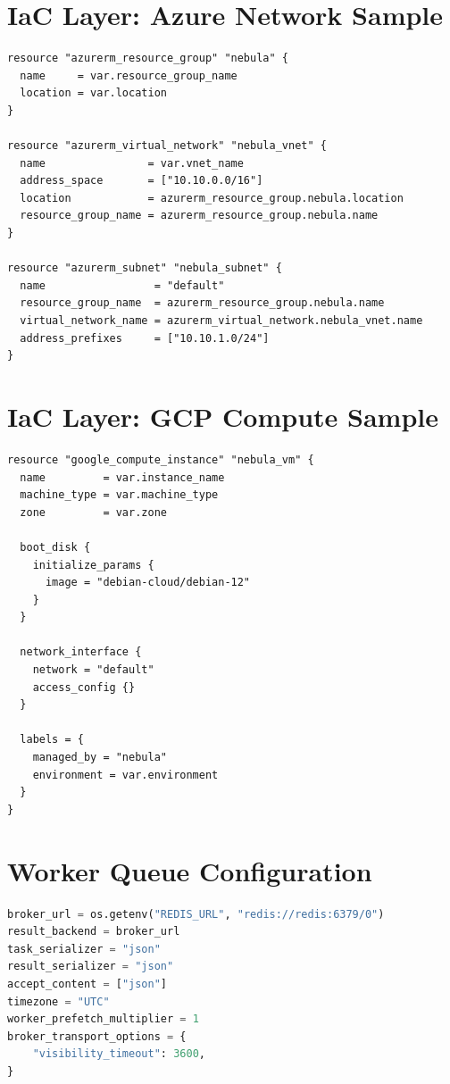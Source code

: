 \section{IaC Layer: Azure Network Sample}
\begin{lstlisting}[language=XML, caption=Azure VNet Module (network.tf)]
resource "azurerm_resource_group" "nebula" {
  name     = var.resource_group_name
  location = var.location
}

resource "azurerm_virtual_network" "nebula_vnet" {
  name                = var.vnet_name
  address_space       = ["10.10.0.0/16"]
  location            = azurerm_resource_group.nebula.location
  resource_group_name = azurerm_resource_group.nebula.name
}

resource "azurerm_subnet" "nebula_subnet" {
  name                 = "default"
  resource_group_name  = azurerm_resource_group.nebula.name
  virtual_network_name = azurerm_virtual_network.nebula_vnet.name
  address_prefixes     = ["10.10.1.0/24"]
}
\end{lstlisting}

\section{IaC Layer: GCP Compute Sample}
\begin{lstlisting}[language=XML, caption=GCP VM Module (main.tf)]
resource "google_compute_instance" "nebula_vm" {
  name         = var.instance_name
  machine_type = var.machine_type
  zone         = var.zone

  boot_disk {
    initialize_params {
      image = "debian-cloud/debian-12"
    }
  }

  network_interface {
    network = "default"
    access_config {}
  }

  labels = {
    managed_by = "nebula"
    environment = var.environment
  }
}
\end{lstlisting}

\section{Worker Queue Configuration}
\begin{lstlisting}[language=Python, caption=Celery Queue Tuning Sample]
broker_url = os.getenv("REDIS_URL", "redis://redis:6379/0")
result_backend = broker_url
task_serializer = "json"
result_serializer = "json"
accept_content = ["json"]
timezone = "UTC"
worker_prefetch_multiplier = 1
broker_transport_options = {
    "visibility_timeout": 3600,
}
\end{lstlisting}

\newpage
